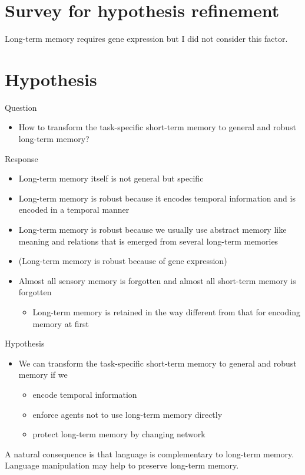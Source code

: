 \documentclass[12pt]{article}
\begin{document}
\section{Survey for hypothesis refinement}
Long-term memory requires gene expression but I did not consider this factor.

\section{Hypothesis}

Question
\begin{itemize}
    \item How to transform the task-specific short-term memory to general and robust long-term memory?
\end{itemize}
Response
\begin{itemize}
    \item Long-term memory itself is not general but specific
    \item Long-term memory is robust because it encodes temporal information and is encoded in a temporal manner
    \item Long-term memory is robust because we usually use abstract memory like meaning and relations that is emerged from several long-term memories
    \item (Long-term memory is robust because of gene expression)
    \item Almost all sensory memory is forgotten and almost all short-term memory is forgotten
    \begin{itemize}
        \item Long-term memory is retained in the way different from that for encoding memory at first
    \end{itemize}
\end{itemize}
Hypothesis
\begin{itemize}
    \item We can transform the task-specific short-term memory to general and robust memory if we
    \begin{itemize}
        \item encode temporal information
        \item enforce agents not to use long-term memory directly
        \item protect long-term memory by changing network
    \end{itemize}
\end{itemize}
A natural consequence is that language is complementary to long-term memory. Language manipulation may help 
to preserve long-term memory.



\end{document}
